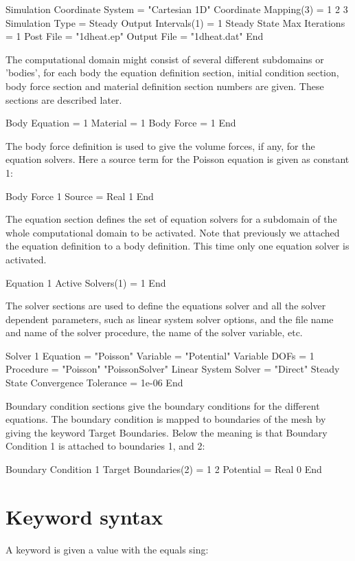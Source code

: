 \ttbegin
Simulation
  Coordinate System = "Cartesian 1D"
  Coordinate Mapping(3) = 1 2 3
  Simulation Type = Steady
  Output Intervals(1) = 1
  Steady State Max Iterations = 1
  Post File = "1dheat.ep"
  Output File = "1dheat.dat"
End
\ttend

The computational domain might consist of several different subdomains or
'bodies', for each body the equation definition section, initial condition
section, body force section and material definition section numbers are
given. These sections are described later.

\ttbegin
Body
  Equation = 1
  Material = 1
  Body Force = 1
End
\ttend

The body force definition is used to give the volume forces, if any,
for the equation solvers. Here a source term for the Poisson equation
is given as constant 1:

\ttbegin
Body Force 1
  Source = Real 1
End
\ttend

The equation section defines the set of equation solvers for a subdomain
of the whole computational  domain to be activated.  Note that previously
we attached the equation definition to a body definition. This time only
one equation solver is activated.

\ttbegin
Equation 1
  Active Solvers(1) = 1
End
\ttend

The solver sections are used to define the equations solver and all the
solver dependent parameters, such as linear system solver options, and
the file name and name of the solver procedure, the name of the solver
variable, etc.

\ttbegin
Solver 1
 Equation = "Poisson"
 Variable = "Potential"
 Variable DOFs = 1
 Procedure = "Poisson" "PoissonSolver"
 Linear System Solver = "Direct"
 Steady State Convergence Tolerance = 1e-06
End
\ttend

Boundary condition sections give the boundary conditions for the different
equations. The boundary condition is mapped to boundaries of the mesh by
giving the keyword Target Boundaries. Below the meaning is that Boundary
Condition 1 is attached to boundaries 1, and 2:

\ttbegin
Boundary  Condition 1
  Target Boundaries(2) = 1 2
   Potential = Real 0
End
\ttend

\section{Keyword syntax}

A keyword is given a value with the equals sing:

